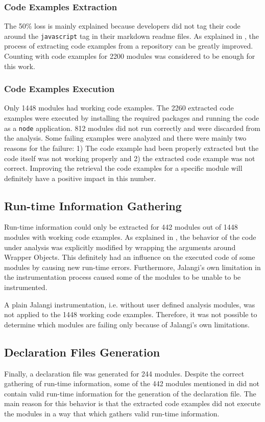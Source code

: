 \subsubsection{Code Examples Extraction}
The 50\% loss is mainly explained because developers did not tag their code around the \texttt{javascript} tag in their markdown readme files. As explained in , the process of extracting code examples from a repository can be greatly improved. Counting with code examples for 2200 modules was considered to be enough for this work.

\subsubsection{Code Examples Execution}
Only 1448 modules had working code examples. The 2260 extracted code examples were executed by installing the required packages and running the code as a \texttt{node} application. 812 modules did not run correctly and were discarded from the analysis. Some failing examples were analyzed and there were mainly two reasons for the failure: 1) The code example had been properly extracted but the code itself was not working properly and 2) the extracted code example was not correct.
Improving the retrieval the code examples for a specific module will definitely have a positive impact in this number.

\subsection{Run-time Information Gathering} \label{sec:experiments-run-time-information-gathering}
Run-time information could only be extracted for 442 modules out of 1448 modules with working code examples. As explained in , the behavior of the code under analysis was explicitly modified by wrapping the arguments around Wrapper Objects. This definitely had an influence on the executed code of some modules by causing new run-time errors. Furthermore, Jalangi's own limitation in the instrumentation process caused some of the modules to be unable to be instrumented.

A plain Jalangi instrumentation, i.e. without user defined analysis modules, was not applied to the 1448 working code examples. Therefore, it was not possible to determine which modules are failing only because of Jalangi's own limitations.

\subsection{Declaration Files Generation} \label{sec:experiments-declaration-files-generation}
Finally, a declaration file was generated for 244 modules. Despite the correct gathering of run-time information, some of the 442 modules mentioned in  did not contain valid run-time information for the generation of the declaration file. The main reason for this behavior is that the extracted code examples did not execute the modules in a way that which gathers valid run-time information.

